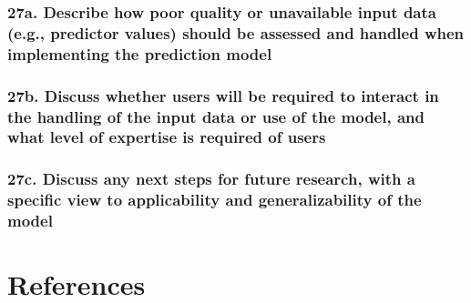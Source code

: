 \documentclass[
  letterpaper,
  DIV=11,
  numbers=noendperiod]{scrartcl}
\begin{document}
\subsubsection{27a. Describe how poor quality or unavailable input data
(e.g., predictor values) should be assessed and handled when
implementing the prediction
model}\label{a.-describe-how-poor-quality-or-unavailable-input-data-e.g.-predictor-values-should-be-assessed-and-handled-when-implementing-the-prediction-model}

\subsubsection{27b. Discuss whether users will be required to interact
in the handling of the input data or use of the model, and what level of
expertise is required of
users}\label{b.-discuss-whether-users-will-be-required-to-interact-in-the-handling-of-the-input-data-or-use-of-the-model-and-what-level-of-expertise-is-required-of-users}

\subsubsection{27c. Discuss any next steps for future research, with a
specific view to applicability and generalizability of the
model}\label{c.-discuss-any-next-steps-for-future-research-with-a-specific-view-to-applicability-and-generalizability-of-the-model}

\section{References}\label{references}
\end{document}
